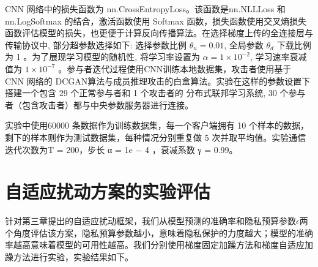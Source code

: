 CNN 网络中的损失函数为 nn.CrossEntropyLoss。该函数是nn.NLLLoss 和\\nn.LogSoftmax 的结合，激活函数使用 Softmax 函数，损失函数使用交叉熵损失函数评估模型的损失，也更便于计算反向传播算法。在选择梯度上传的全连接层与传输协议中, 部分超参数选择如下: 选择参数比例 $\theta_{u}=0.01$, 全局参数 $\theta_{d}$ 下载比例为 1 。为了展现学习模型的随机性, 将学习率设置为 $\alpha=1 \times 10^{-2}$, 学习速率衰减值为 $1 \times 10^{-7}$ 。参与者迭代过程使用CNN训练本地数据集，攻击者使用基于 CNN 网络的 DCGAN算法与成员推理攻击的白盒算法。实验在这样的参数设置下搭建一个包含 29 个正常参与者和 1 个攻击者的 分布式联邦学习系统, 30 个参与者（包含攻击者）都与中央参数服务器进行连接。

实验中使用60000 条数据作为训练数据集，每一个客户端拥有 10 个样本的数据，剩下的样本则作为测试数据集，每种情况分别重复做 5 次并取平均值。实验通信迭代次数为T = 200，步长 α = 1e − 4 ，衰减系数 γ = 0.99。

\section{自适应扰动方案的实验评估}
针对第三章提出的自适应扰动框架，我们从模型预测的准确率和隐私预算参数$\epsilon$两个角度评估该方案，隐私预算参数越小，意味着隐私保护的力度越大；模型的准确率越高意味着模型的可用性越高。我们分别使用梯度固定加躁方法和梯度自适应加躁方法进行实验，实验结果如下。

